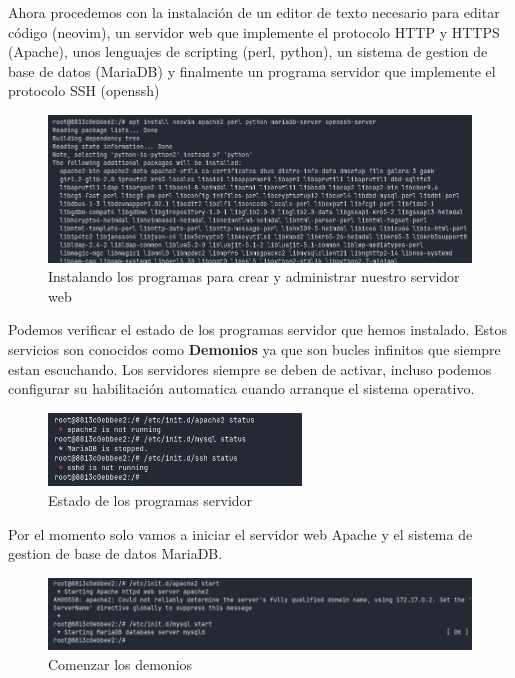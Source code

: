 Ahora procedemos con la instalación de un editor de texto necesario para editar código (neovim), un servidor web que implemente el protocolo HTTP y HTTPS (Apache), unos lenguajes de scripting (perl, python), un sistema de gestion de base de datos (MariaDB) y finalmente un programa servidor que implemente el protocolo SSH (openssh)

\begin{figure}[H]
  \centering
  \includegraphics[width=1.0\textwidth]{img/install_programs.png}
  \caption{Instalando los programas para crear y administrar nuestro servidor web}
\end{figure}

Podemos verificar el estado de los programas servidor que hemos instalado. Estos servicios son conocidos como \textbf{Demonios} ya que son bucles infinitos que siempre estan escuchando. Los servidores siempre se 
deben de activar, incluso podemos configurar su habilitación  automatica cuando arranque el sistema operativo.

\begin{figure}[H]
  \centering
  \includegraphics[width=0.6\textwidth]{img/check_daemons.png}
  \caption{Estado de los programas servidor}
\end{figure}

Por el momento solo vamos a iniciar el servidor web Apache y el sistema de gestion de base de datos MariaDB.

\begin{figure}[H]
  \centering
  \includegraphics[width=1.0\textwidth]{img/start_daemons.png}
  \caption{Comenzar los demonios}
\end{figure}

